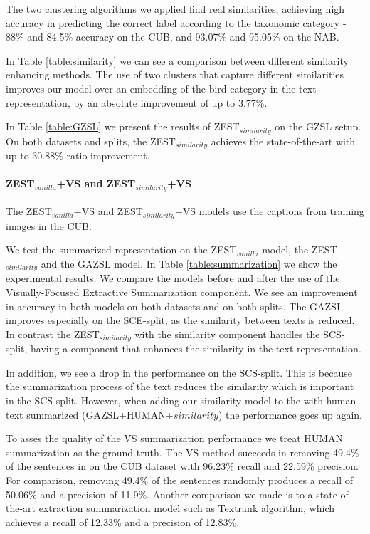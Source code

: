 \documentclass[11pt,a4paper]{article}
\begin{document}
The two clustering algorithms we applied find real similarities, achieving high accuracy in predicting the correct label according to the taxonomic category - 88\% and 84.5\% accuracy on the CUB, and 93.07\% and 95.05\% on the NAB. 

In Table \ref{table:similarity} we can see a comparison between different similarity enhancing methods. The use of two clusters that capture different similarities improves our model over an embedding of the bird category in the text representation, by an absolute improvement of up to 3.77\%.
\par

In Table \ref{table:GZSL} we present the results of ZEST$_{similarity}$ on the GZSL setup. On both datasets and splits, the ZEST$_{similarity}$ achieves the state-of-the-art with up to 30.88\% ratio improvement.

\paragraph{ZEST$_{vanilla}$+VS and ZEST$_{similarity}$+VS }
The ZEST$_{vanilla}$+VS and  ZEST$_{similarity}$+VS models use the captions from training images in the CUB. 

We test the summarized representation on the ZEST$_{vanilla}$ model, the ZEST$_{similarity}$ and the GAZSL \citep{zhu2018generative} model. In Table \ref{table:summarization} we show the experimental results. We compare the models before and after the use of the Visually-Focused  Extractive Summarization component. We see an improvement in accuracy in both models on both datasets and on both splits. The GAZSL improves especially on the SCE-split, as the similarity between texts is reduced. In contrast the ZEST$_{similarity}$ with the similarity component handles the SCS-split, having a component that enhances the similarity in the text representation.  \par

In addition, we see a drop in the \citep{zhu2018generative} performance on the SCS-split. This is because the summarization process of the text reduces the similarity which is important in the SCS-split. However, when adding our similarity model to the \citep{zhu2018generative} with human text summarized (GAZSL+HUMAN+$similarity$) the performance goes up again.
\par  

To asses the quality of the VS summarization performance we treat HUMAN summarization as the ground truth. The VS method succeeds in removing 49.4\% of the sentences in on the CUB dataset with 96.23\% recall and 22.59\% precision. For comparison, removing 49.4\% of the sentences randomly produces a recall of 50.06\% and a precision of 11.9\%.
Another comparison we made is to a state-of-the-art extraction summarization model such as  Textrank \citep{mihalcea2004textrank} algorithm, which achieves a recall of 12.33\% and a precision of 12.83\%.
\end{document}
